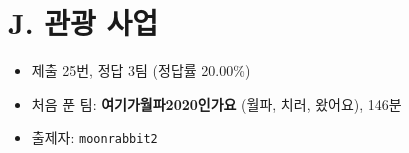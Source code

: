\section{J. 관광 사업}

\begin{frame} %
    \begin{itemize}
        \item 제출 25번, 정답 3팀 (정답률 20.00\%)
        \item 처음 푼 팀: \textbf{여기가월파2020인가요} (월파, 치러, 왔어요), 146분
        \item 출제자: \texttt{moonrabbit2}
    \end{itemize}
\end{frame}

